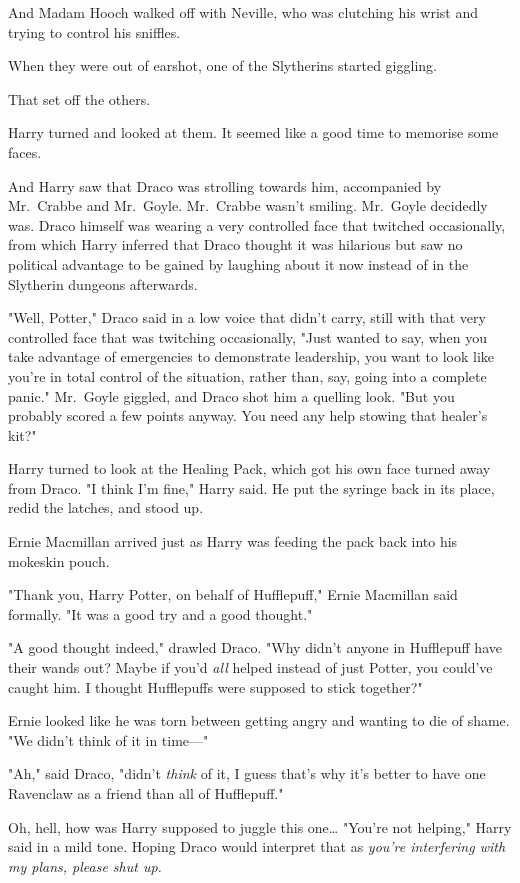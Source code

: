 And Madam Hooch walked off with Neville, who was clutching his wrist and trying
to control his sniffles.

When they were out of earshot, one of the Slytherins started giggling.

That set off the others.

Harry turned and looked at them. It seemed like a good time to memorise some
faces.

And Harry saw that Draco was strolling towards him, accompanied by Mr.~Crabbe
and Mr.~Goyle. Mr.~Crabbe wasn't smiling. Mr.~Goyle decidedly was. Draco
himself was wearing a very controlled face that twitched occasionally, from
which Harry inferred that Draco thought it was hilarious but saw no political
advantage to be gained by laughing about it now instead of in the Slytherin
dungeons afterwards.

"Well, Potter," Draco said in a low voice that didn't carry, still with that
very controlled face that was twitching occasionally, "Just wanted to say, when
you take advantage of emergencies to demonstrate leadership, you want to look
like you're in total control of the situation, rather than, say, going into a
complete panic." Mr.~Goyle giggled, and Draco shot him a quelling look. "But
you probably scored a few points anyway. You need any help stowing that
healer's kit?"

Harry turned to look at the Healing Pack, which got his own face turned away
from Draco. "I think I'm fine," Harry said. He put the syringe back in its
place, redid the latches, and stood up.

Ernie Macmillan arrived just as Harry was feeding the pack back into his
mokeskin pouch.

"Thank you, Harry Potter, on behalf of Hufflepuff," Ernie Macmillan said
formally. "It was a good try and a good thought."

"A good thought indeed," drawled Draco. "Why didn't anyone in Hufflepuff have
their wands out? Maybe if you'd \emph{all} helped instead of just Potter, you
could've caught him. I thought Hufflepuffs were supposed to stick together?"

Ernie looked like he was torn between getting angry and wanting to die of
shame. "We didn't think of it in time---"

"Ah," said Draco, "didn't \emph{think} of it, I guess that's why it's better to
have one Ravenclaw as a friend than all of Hufflepuff."

Oh, hell, how was Harry supposed to juggle this one{\ldots} "You're not
helping," Harry said in a mild tone. Hoping Draco would interpret that as
\emph{you're interfering with my plans, please shut up.}

